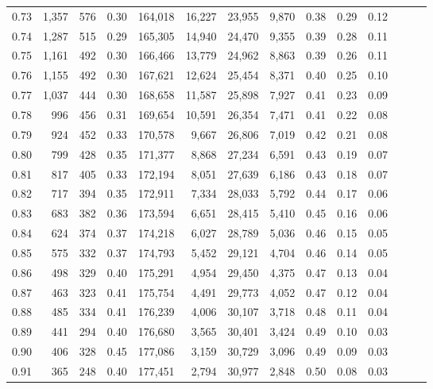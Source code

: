 \begin{tabular}{rrrrrrrrrrrrrr}
0.73 &  1,357 &    576 &  0.30 &  164,018 &   16,227 &  23,955 &   9,870 &  0.38 &  0.29 &      0.12 \\
0.74 &  1,287 &    515 &  0.29 &  165,305 &   14,940 &  24,470 &   9,355 &  0.39 &  0.28 &      0.11 \\
0.75 &  1,161 &    492 &  0.30 &  166,466 &   13,779 &  24,962 &   8,863 &  0.39 &  0.26 &      0.11 \\
0.76 &  1,155 &    492 &  0.30 &  167,621 &   12,624 &  25,454 &   8,371 &  0.40 &  0.25 &      0.10 \\
0.77 &  1,037 &    444 &  0.30 &  168,658 &   11,587 &  25,898 &   7,927 &  0.41 &  0.23 &      0.09 \\
0.78 &    996 &    456 &  0.31 &  169,654 &   10,591 &  26,354 &   7,471 &  0.41 &  0.22 &      0.08 \\
0.79 &    924 &    452 &  0.33 &  170,578 &    9,667 &  26,806 &   7,019 &  0.42 &  0.21 &      0.08 \\
0.80 &    799 &    428 &  0.35 &  171,377 &    8,868 &  27,234 &   6,591 &  0.43 &  0.19 &      0.07 \\
0.81 &    817 &    405 &  0.33 &  172,194 &    8,051 &  27,639 &   6,186 &  0.43 &  0.18 &      0.07 \\
0.82 &    717 &    394 &  0.35 &  172,911 &    7,334 &  28,033 &   5,792 &  0.44 &  0.17 &      0.06 \\
0.83 &    683 &    382 &  0.36 &  173,594 &    6,651 &  28,415 &   5,410 &  0.45 &  0.16 &      0.06 \\
0.84 &    624 &    374 &  0.37 &  174,218 &    6,027 &  28,789 &   5,036 &  0.46 &  0.15 &      0.05 \\
0.85 &    575 &    332 &  0.37 &  174,793 &    5,452 &  29,121 &   4,704 &  0.46 &  0.14 &      0.05 \\
0.86 &    498 &    329 &  0.40 &  175,291 &    4,954 &  29,450 &   4,375 &  0.47 &  0.13 &      0.04 \\
0.87 &    463 &    323 &  0.41 &  175,754 &    4,491 &  29,773 &   4,052 &  0.47 &  0.12 &      0.04 \\
0.88 &    485 &    334 &  0.41 &  176,239 &    4,006 &  30,107 &   3,718 &  0.48 &  0.11 &      0.04 \\
0.89 &    441 &    294 &  0.40 &  176,680 &    3,565 &  30,401 &   3,424 &  0.49 &  0.10 &      0.03 \\
0.90 &    406 &    328 &  0.45 &  177,086 &    3,159 &  30,729 &   3,096 &  0.49 &  0.09 &      0.03 \\
0.91 &    365 &    248 &  0.40 &  177,451 &    2,794 &  30,977 &   2,848 &  0.50 &  0.08 &      0.03 \\

\end{tabular}
